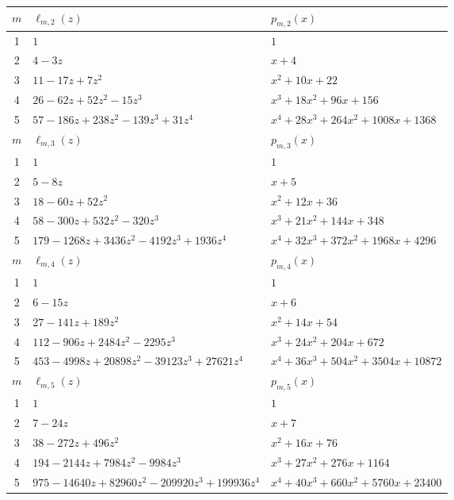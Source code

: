 \documentclass[12pt,reqno]{article}
\numberwithin{sfootnote}{section}
\newcommand{\subtableskip}{\bigskip}
\newcommand{\tabletopstrut}[0]{\rule{0pt}{3ex}}
\numberwithin{equation}{section}
\theoremstyle{plain}
\theoremstyle{definition}
\theoremstyle{remark}
\begin{document}
\begin{table}[h]
\begin{subtable}{\textwidth}
\begin{tabular}{|c|l|l|} \hline 
\hline\tabletopstrut 
$m$ & $\ell_{m,2}(z)$ & $p_{m,2}(x)$ \\ \hline 
1 & $1$ & $1$ \\ 
2 & $4 - 3z$ & $x+4$ \\ 
3 & $11 - 17z + 7z^2$ & $x^2+10x+22$ \\ 
4 & $26 - 62z + 52z^2  - 15z^3$ & 
    $x^3+18x^2+96x+156$ \\ 
5 & $57 - 186z + 238z^2 - 139z^3 + 31z^4$ & 
    $x^4+28x^3+264x^2+1008x+1368$ \\ \hline 
\hline\tabletopstrut 
$m$ & $\ell_{m,3}(z)$ & $p_{m,3}(x)$ \\ \hline 
1 & $1$ & $1$ \\ 
2 & $5 - 8z$ & $x+5$ \\ 
3 & $18 - 60z + 52 z^2$ & $x^2+12x+36$ \\ 
4 & $58 - 300 z + 532 z^2  - 320 z^3$ & $x^3+21x^2+144x+348$ \\ 
5 & $179 - 1268 z + 3436 z^2 - 4192 z^3 + 1936 z^4$ & 
    $x^4+32x^3+372x^2+1968x+4296$ \\ \hline 
\hline\tabletopstrut 
$m$ & $\ell_{m,4}(z)$ & $p_{m,4}(x)$ \\ \hline 
1 & $1$ & $1$ \\ 
2 & $6 - 15z$ & $x+6$ \\ 
3 & $27 - 141z + 189 z^2$ & $x^2+14x+54$ \\ 
4 & $112 - 906 z + 2484 z^2  - 2295 z^3$ & 
    $x^3+24x^2+204x+672$ \\ 
5 & $453 - 4998 z + 20898 z^2 - 39123 z^3 + 27621 z^4$ & 
    $x^4+36x^3+504x^2+3504x+10872$ \\ \hline 
\hline\tabletopstrut 
$m$ & $\ell_{m,5}(z)$ & $p_{m,5}(x)$ \\ \hline 
1 & $1$ & $1$ \\ 
2 & $7 - 24z$ & $x+7$ \\ 
3 & $38 - 272z + 496 z^2$ & 
    $x^2+16x+76$ \\ 
4 & $194 - 2144 z + 7984 z^2  - 9984 z^3$ & 
    $x^3+27x^2+276x+1164$ \\ 
5 & $975 - 14640 z + 82960 z^2 - 209920 z^3 + 199936 z^4$ & 
    $x^4+40x^3+660x^2+5760x+23400$ \\ \hline 
\hline 
\end{tabular} 

\subtableskip 


\end{subtable}
\end{table}
\end{document}
